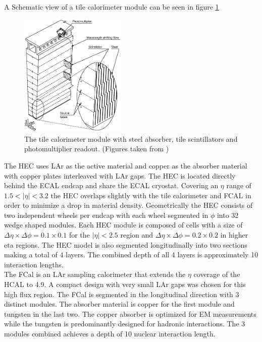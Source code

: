 \indent A Schematic view of a tile calorimeter module can be seen in figure \ref{LHC:fig:TileCalo}

\begin{figure}[h!]
\centering
\includegraphics[width=0.45\textwidth, angle=0]{figures/LHC_ATLAS/TileCal_Module3.eps}
\caption{ The tile calorimeter module with steel absorber, tile scintillators and photomultiplier readout.  (Figures taken from \cite{ATLAS_JINST}) \label{LHC:fig:TileCalo}}
\end{figure}


\indent The HEC uses LAr as the active material and copper as the absorber material with copper plates interleaved with LAr gaps.  The HEC is located directly behind the ECAL endcap and share the ECAL cryostat.  Covering an $\eta$ range of $1.5<|\eta| < 3.2$ the HEC overlaps slightly with the tile calorimeter and FCAL in order to minimize a drop in material density.  Geometrically the HEC consists of two independent wheels per endcap with each wheel segmented in $\phi$ into 32 wedge shaped modules.  Each HEC module is composed of cells with a size of $\Delta\eta \times \Delta\phi = 0.1 \times 0.1$ for the $|\eta|<2.5$ region and $\Delta\eta \times \Delta\phi = 0.2 \times 0.2$ in higher eta regions.  The HEC model is also segmented longitudinally into two sections making a total of 4 layers. The combined depth of all 4 layers is approximately 10 interaction lengths. \\

\indent The FCal is an LAr sampling calorimeter that extends the $\eta$ coverage of the HCAL to 4.9.  A compact design with very small LAr gaps was chosen for this high flux region.  The FCal is segmented in the longitudinal direction with 3 distinct modules. The absorber material is copper for the first module and tungsten in the last two.  The copper absorber is optimized for EM measurements while the tungsten is predominantly designed for hadronic interactions.  The 3 modules combined achieves a depth of 10 nuclear interaction length. \\

